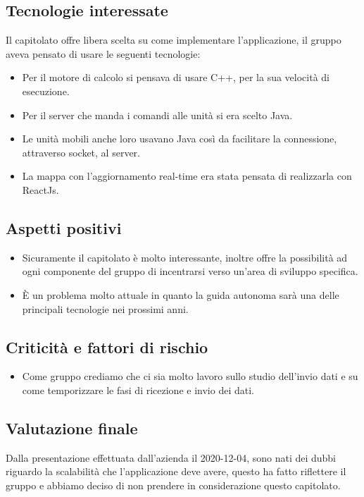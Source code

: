 \subsection{Tecnologie interessate}
Il capitolato offre libera scelta su come implementare l'applicazione, il gruppo aveva pensato di usare le seguenti tecnologie:
\begin{itemize}
\item Per il motore di calcolo si pensava di usare C++, per la sua velocità di esecuzione.
\item Per il server che manda i comandi alle unità si era scelto Java.
\item Le unità mobili anche loro usavano Java così da facilitare la connessione, attraverso socket, al server.
\item La mappa con l'aggiornamento real-time era stata pensata di realizzarla con ReactJs.
\end{itemize}

\subsection{Aspetti positivi}
\begin{itemize}
\item Sicuramente il capitolato è molto interessante, inoltre offre la possibilità ad ogni componente del gruppo di incentrarsi verso un’area di sviluppo specifica.
\item È un problema molto attuale in quanto la guida autonoma sarà una delle principali tecnologie nei prossimi anni.
\end{itemize}

\subsection{Criticità e fattori di rischio}
\begin{itemize}
\item Come gruppo crediamo che ci sia molto lavoro sullo studio dell'invio dati e su come temporizzare le fasi di ricezione e invio dei dati.
\end{itemize}

\subsection{Valutazione finale}
Dalla presentazione effettuata dall'azienda il 2020-12-04, sono nati dei dubbi riguardo la scalabilità che l'applicazione deve avere, questo ha fatto riflettere il gruppo e abbiamo deciso di non prendere in considerazione questo capitolato.